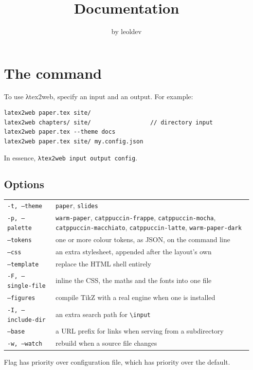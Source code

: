 \documentclass[11pt]{article}
\title{Documentation}
\author{by leoldev}
\date{}
\begin{document}
\maketitle

\section{The command}

To use λtex2web, specify an input and an output. For example:

\begin{verbatim}
latex2web paper.tex site/
latex2web chapters/ site/                 // directory input
latex2web paper.tex --theme docs
latex2web paper.tex site/ my.config.json
\end{verbatim}

In essence, \texttt{λtex2web input output config}.

\subsection{Options}

\begin{tabular}{@{}ll@{}}
\texttt{-t, --theme} & \texttt{paper}, \texttt{slides} \\
\texttt{-p, --palette} & \texttt{warm-paper}, \texttt{catppuccin-frappe},
  \texttt{catppuccin-mocha}, \texttt{catppuccin-macchiato},
  \texttt{catppuccin-latte}, \texttt{warm-paper-dark} \\
\texttt{--tokens} & one or more colour tokens, as JSON, on the command line \\
\texttt{--css} & an extra stylesheet, appended after the layout's own \\
\texttt{--template} & replace the HTML shell entirely \\
\texttt{-F, --single-file} & inline the CSS, the maths and the fonts into one file \\
\texttt{--figures} & compile TikZ with a real engine when one is installed \\
\texttt{-I, --include-dir} & an extra search path for \texttt{\textbackslash input} \\
\texttt{--base} & a URL prefix for links when serving from a subdirectory \\
\texttt{-w, --watch} & rebuild when a source file changes \\
\end{tabular}

Flag has priority over configuration file, which has priority over the default.
\end{document}
